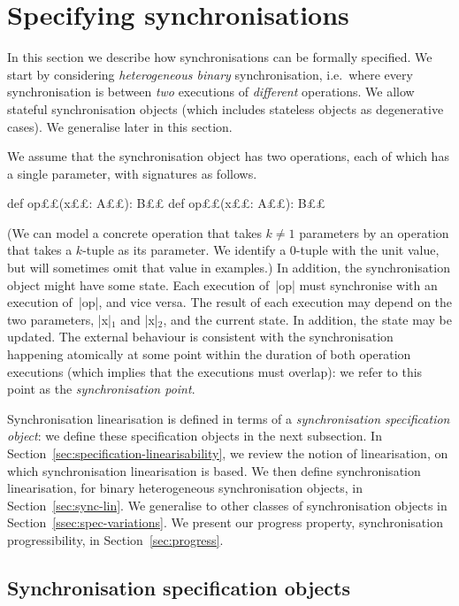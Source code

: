 \section{Specifying synchronisations}
\label{sec:spec}

In this section we describe how synchronisations can be formally specified.
We start by considering \emph{heterogeneous binary} synchronisation,
i.e.~where every synchronisation is between \emph{two} executions of
\emph{different} operations.  We allow stateful synchronisation objects (which
includes stateless objects as degenerative cases).  We generalise later in
this section.


We assume that the synchronisation object has two operations, each of which
has a single parameter, with signatures as follows.
%
\begin{scala}
def op££(x££: A££): B££
def op££(x££: A££): B££
\end{scala}
%
(We can model a concrete operation that takes $k \ne 1$ parameters by an
operation that takes a $k$-tuple as its parameter.  We identify a 0-tuple with
the unit value, but will sometimes omit that value in examples.)
%
In addition, the synchronisation object might have some state.
Each execution of~|op| must synchronise with an execution of~|op|, and
vice versa.  The result of each execution may depend on the two parameters,
|x|$_1$ and |x|$_2$, and the current state.  In addition, the state may be
updated.  The external behaviour is consistent with the synchronisation
happening atomically at some point within the duration of both operation
executions (which implies that the executions must overlap): we refer to this
point as the \emph{synchronisation point}.

Synchronisation linearisation is defined in terms of a \emph{synchronisation
  specification object}: we define these specification objects in the next
subsection.  In Section~\ref{sec:specification-linearisability}, we review the
notion of linearisation, on which synchronisation linearisation is based.  We
then define synchronisation linearisation, for binary heterogeneous
synchronisation objects, in Section~\ref{sec:sync-lin}.  We generalise to
other classes of synchronisation objects in
Section~\ref{ssec:spec-variations}.  We present our progress property,
synchronisation progressibility, in Section~\ref{sec:progress}.


\subsection{Synchronisation specification objects}

